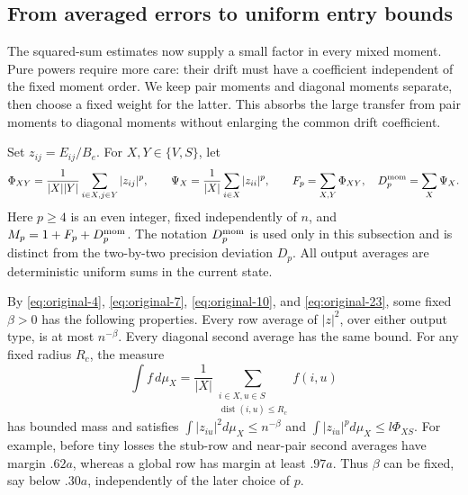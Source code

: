 \subsection{From averaged errors to uniform entry bounds}

The squared-sum estimates now supply a small factor in every mixed
moment. Pure powers require more care: their drift must have a
coefficient independent of the fixed moment order. We keep pair moments
and diagonal moments separate, then choose a fixed weight for the latter.
This absorbs the large transfer from pair moments to diagonal moments
without enlarging the common drift coefficient.

Set \(z_{ij}=E_{ij}/B_e\). For \(X,Y\in\{V,S\}\), let
\[
 \Phi_{XY}=\frac1{|X||Y|}\sum_{i\in X,j\in Y}|z_{ij}|^p,
 \qquad
 \Psi_X=\frac1{|X|}\sum_{i\in X}|z_{ii}|^p,
 \qquad F_p=\sum_{X,Y}\Phi_{XY},\quad D_p^{\rm mom}=\sum_X\Psi_X.
\]
Here \(p\ge4\) is an even integer, fixed independently of \(n\),
and \(M_p=1+F_p+D_p^{\rm mom}\). The notation
\(D_p^{\rm mom}\) is used only in this subsection and is distinct
from the two-by-two precision deviation \(D_p\).
All output averages are deterministic uniform sums in the current state.

By \eqref{eq:original-4}, \eqref{eq:original-7},
\eqref{eq:original-10}, and \eqref{eq:original-23}, some fixed
\(\beta>0\) has the following properties. Every row average of
\(|z|^2\), over either output type, is at most \(n^{-\beta}\).
Every diagonal second average has the same bound. For any fixed radius
\(R_c\), the measure
\[
 \int f\,d\mu_X=\frac1{|X|}
    \sum_{\substack{i\in X,u\in S\\
                    \operatorname{dist}(i,u)\le R_c}}f(i,u)
\]
has bounded mass and satisfies
\(\int|z_{iu}|^2d\mu_X\le n^{-\beta}\) and
\(\int|z_{iu}|^pd\mu_X\le l\Phi_{XS}\).
For example, before tiny losses the stub-row and near-pair second
averages have margin \(.62a\), whereas a global row has margin at
least \(.97a\). Thus \(\beta\) can be fixed, say below \(.30a\),
independently of the later choice of \(p\).

